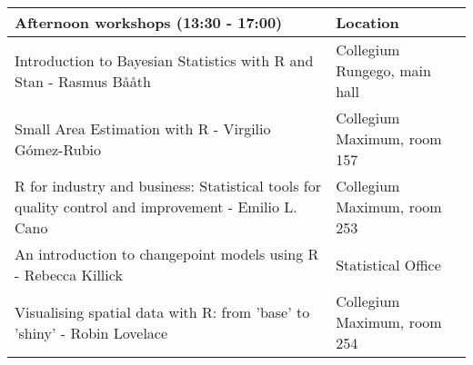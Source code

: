 \begingroup\fontsize{9pt}{10pt}\selectfont
\begin{longtable}{|p{8.2cm}|p{4.6cm}|}
  \hline
Afternoon workshops (13:30 - 17:00) & Location \\ 
  \hline
Introduction to Bayesian Statistics with R and Stan - Rasmus Bååth & Collegium Rungego, main hall \\ 
  Small Area Estimation with R - Virgilio Gómez-Rubio & Collegium Maximum, room 157 \\ 
  R for industry and business: Statistical tools for quality control and improvement - Emilio L. Cano & Collegium Maximum, room 253 \\ 
  An introduction to changepoint models using R - Rebecca Killick & Statistical Office \\ 
  Visualising spatial data with R: from 'base' to 'shiny' - Robin Lovelace & Collegium Maximum, room 254 \\ 
   \hline
\end{longtable}
\endgroup
